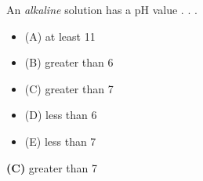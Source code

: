 

An {\it alkaline} solution has a pH value . . .

\begin{itemize}
\item{(A)} at least 11
\vskip 5pt 
\item{(B)} greater than 6
\vskip 5pt 
\item{(C)} greater than 7
\vskip 5pt 
\item{(D)} less than 6
\vskip 5pt 
\item{(E)} less than 7
\end{itemize}







{\bf (C)} greater than 7
 










